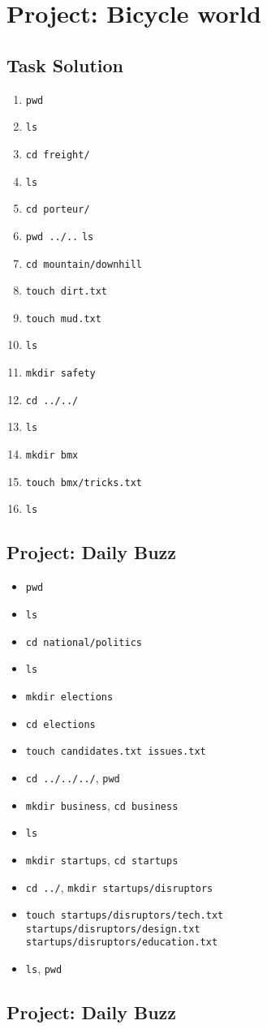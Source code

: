 \documentclass[12pt]{article}
\begin{document}
\section{Project: Bicycle world}
\subsection{Task Solution}
\begin{enumerate}[1.]
    \item \texttt{pwd}
    \item \texttt{ls}
    \item \texttt{cd freight/}
    \item \texttt{ls}
    \item \texttt{cd porteur/}
    \item \texttt{pwd ../..} \texttt{ls}
    \item \texttt{cd mountain/downhill}
    \item \texttt{touch dirt.txt}
    \item \texttt{touch mud.txt}
    \item \texttt{ls}
    \item \texttt{mkdir safety}
    \item \texttt{cd ../../}
    \item \texttt{ls}
    \item \texttt{mkdir bmx}
    \item \texttt{touch bmx/tricks.txt}
    \item \texttt{ls}
\end{enumerate}

\bigskip

\subsection{Project: Daily Buzz}
\begin{itemize}
    \item \texttt{pwd}
    \item \texttt{ls}
    \item \texttt{cd national/politics}
    \item \texttt{ls}
    \item \texttt{mkdir elections}
    \item \texttt{cd elections}
    \item \texttt{touch candidates.txt issues.txt}
    \item \texttt{cd ../../../}, \texttt{pwd}
    \item \texttt{mkdir business}, \texttt{cd business}
    \item \texttt{ls}
    \item \texttt{mkdir startups}, \texttt{cd startups}
    \item \texttt{cd ../}, \texttt{mkdir startups/disruptors}
    \item \texttt{touch startups/disruptors/tech.txt\\ startups/disruptors/design.txt\\ startups/disruptors/education.txt}
    \item \texttt{ls}, \texttt{pwd}
\end{itemize}

\subsection{Project: Daily Buzz}
\end{document}
